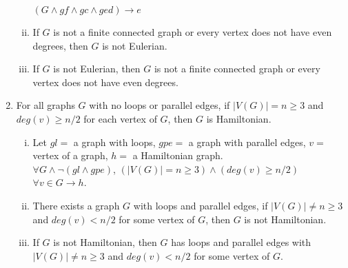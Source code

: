 \documentclass{article}
\newcommand{\abs}[1]{\left|#1\right|}
\begin{document}
\begin{enumerate}
\begin{enumerate}[i.]
	$(G\wedge gf\wedge gc\wedge ged)\to e$
	\item If $G$ is not a finite connected graph or every vertex does not have even degrees, then $G$ is not Eulerian.
	\item If $G$ is not Eulerian, then $G$ is not a finite connected graph or every vertex does not have even degrees.
	\end{enumerate}
\item For all graphs $G$ with no loops or parallel edges, if $\abs{V(G)}=n\geq3$ and $deg(v)\geq n/2$ for each vertex of $G$, 
then $G$ is Hamiltonian.
	\begin{enumerate}[i.]
	\item Let $gl=$ a graph with loops, $gpe=$ a graph with parallel edges, $v=$ vertex of a graph, $h=$ a Hamiltonian graph.\\
	$\forall G\wedge\neg(gl\wedge gpe)$, $(\abs{V(G)}=n\geq3)\wedge(deg(v)\geq n/2)$ $\forall v\in G\to h$.
	\item There exists a graph $G$ with loops and parallel edges, if $\abs{V(G)}\not=n\geq3$ and $deg(v)<n/2$ for some vertex of 
	$G$, then $G$ is not Hamiltonian.
	\item If $G$ is not Hamiltonian, then $G$ has loops and parallel edges with $\abs{V(G)}\not=n\geq3$ and $deg(v)<n/2$ 
	for some vertex of $G$.
	\end{enumerate}
\end{enumerate}
\end{document}
